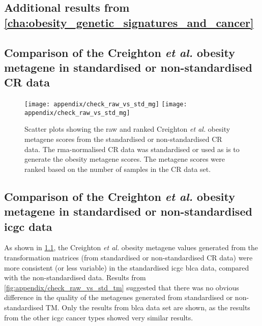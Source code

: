 \begin{appendices}
	\renewcommand{\thesection}{\Alph{chapter}\arabic{section}}

	\chapter{Additional results from \cref{cha:obesity_genetic_signatures_and_cancer}}
	\label{app:a}

	\section{Comparison of the Creighton \textit{et al.} obesity metagene in standardised or non-standardised CR data}
	\label{sec:metagenes_created_from_raw_data_vs_standardised_data}

	\begin{figure}[htpb]
		\centering
		\texttt{[image: appendix/check\_raw\_vs\_std\_mg]}
		\hfill
		\texttt{[image: appendix/check\_raw\_vs\_std\_mg]}
		\caption[Comparison of the raw and ranked Creighton \textit{et al.} obesity metagene scores from the standardised or non-standardised CR data]{Scatter plots showing the raw and ranked Creighton \textit{et al.} obesity metagene scores from the standardised or non-standardised CR data.
		The \gls{rma}-normalised CR data was standardised or used as is to generate the obesity metagene scores.
		The metagene scores were ranked based on the number of samples in the CR data set.
		}
		\label{fig:appendix/check_raw_vs_std}
	\end{figure}

	\section{Comparison of the Creighton \textit{et al.} obesity metagene in standardised or non-standardised \gls{icgc} data}
	\label{sec:comp_cr_raw_std_icgc}

	As shown in \cref{fig:appendix/check_raw_vs_std}, the Creighton \textit{et al.} obesity metagene values generated from the transformation matrices (from standardised or non-standardised CR data) were more consistent (or less variable) in the standardised \gls{icgc} \gls{blca} data, compared with the non-standardised data.
	Results from \cref{fig:appendix/check_raw_vs_std_tm} suggested that there was no obvious difference in the quality of the metagenes generated from standardised or non-standardised TM.
	Only the results from \gls{blca} data set are shown, as the results from the other \gls{icgc} cancer types showed very similar results.


\end{appendices}
